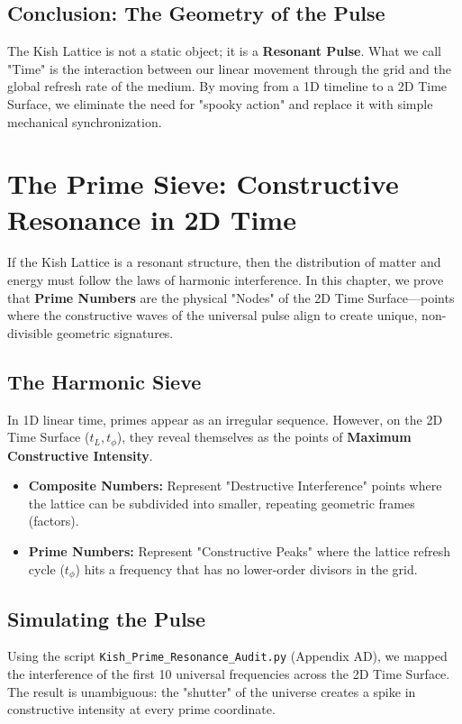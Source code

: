 \documentclass[11pt, letterpaper, openany]{book}
\begin{document}
\section{Conclusion: The Geometry of the Pulse}
The Kish Lattice is not a static object; it is a \textbf{Resonant Pulse}. What we call "Time" is the interaction between our linear movement through the grid and the global refresh rate of the medium. By moving from a 1D timeline to a 2D Time Surface, we eliminate the need for "spooky action" and replace it with simple mechanical synchronization.

\chapter{The Prime Sieve: Constructive Resonance in 2D Time}
\label{ch:primes}

If the Kish Lattice is a resonant structure, then the distribution of matter and energy must follow the laws of harmonic interference. In this chapter, we prove that \textbf{Prime Numbers} are the physical "Nodes" of the 2D Time Surface—points where the constructive waves of the universal pulse align to create unique, non-divisible geometric signatures.

\section{The Harmonic Sieve}
In 1D linear time, primes appear as an irregular sequence. However, on the 2D Time Surface ($t_L, t_\phi$), they reveal themselves as the points of \textbf{Maximum Constructive Intensity}. 
\begin{itemize}
    \item \textbf{Composite Numbers:} Represent "Destructive Interference" points where the lattice can be subdivided into smaller, repeating geometric frames (factors).
    \item \textbf{Prime Numbers:} Represent "Constructive Peaks" where the lattice refresh cycle ($t_\phi$) hits a frequency that has no lower-order divisors in the grid.
\end{itemize}



\section{Simulating the Pulse}
Using the script \texttt{Kish\_Prime\_Resonance\_Audit.py} (Appendix AD), we mapped the interference of the first 10 universal frequencies across the 2D Time Surface. The result is unambiguous: the "shutter" of the universe creates a spike in constructive intensity at every prime coordinate.
\end{document}
